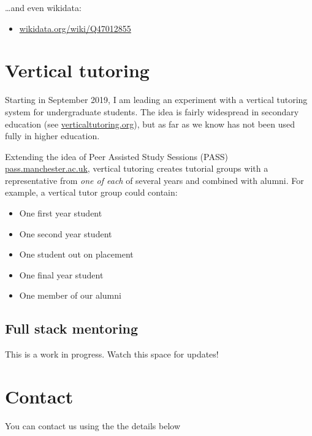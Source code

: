 \documentclass[12pt,]{book}
\providecommand{\tightlist}{%
  \setlength{\itemsep}{0pt}\setlength{\parskip}{0pt}}
\begin{document}
\ldots{}and even wikidata:

\begin{itemize}
\tightlist
\item
  \href{https://www.wikidata.org/wiki/Q47012855}{wikidata.org/wiki/Q47012855}
\end{itemize}

\hypertarget{vertical-tutoring}{%
\chapter{Vertical tutoring}\label{vertical-tutoring}}

Starting in September 2019, I am leading an experiment with a vertical tutoring system for undergraduate students. The idea is fairly widespread in secondary education (see \href{https://www.verticaltutoring.org/}{verticaltutoring.org}), but as far as we know has not been used fully in higher education.

Extending the idea of Peer Assisted Study Sessions (PASS) \href{http://www.pass.manchester.ac.uk}{pass.manchester.ac.uk}, vertical tutoring creates tutorial groups with a representative from \emph{one of each} of several years and combined with alumni. For example, a vertical tutor group could contain:

\begin{itemize}
\tightlist
\item
  One first year student
\item
  One second year student
\item
  One student out on placement
\item
  One final year student
\item
  One member of our alumni
\end{itemize}

\hypertarget{full-stack-mentoring}{%
\section{Full stack mentoring}\label{full-stack-mentoring}}

This is a work in progress. Watch this space for updates!

\hypertarget{contact}{%
\chapter{Contact}\label{contact}}

You can contact us using the the details below
\end{document}

